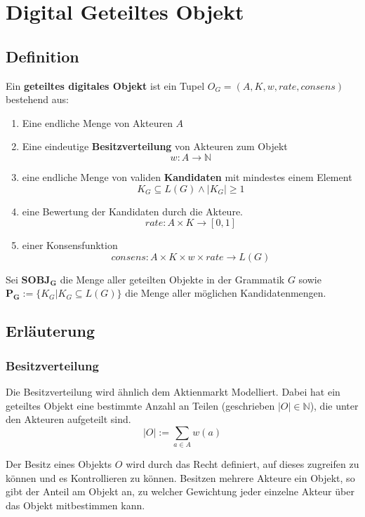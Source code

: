 \documentclass[]{article}
\begin{document}
\newpage
\section{Digital Geteiltes Objekt}
\subsection{Definition}

Ein \textbf{geteiltes digitales Objekt} ist ein Tupel $O_G=(A, K, w, rate, consens)$ bestehend aus:

\begin{enumerate}
\item Eine endliche Menge von Akteuren $A$
\item Eine eindeutige \textbf{Besitzverteilung} von Akteuren zum Objekt
  \[w: A \rightarrow \mathbb{N}\]
\item eine endliche Menge von validen \textbf{Kandidaten} mit mindestes einem Element 
  \[K_G \subseteq L(G) \land |K_G| \geq 1\] 
\item eine Bewertung der Kandidaten durch die Akteure. 
  \[rate: A\times K \rightarrow [0,1]\]
\item einer Konsensfunktion
  \[consens: A\times K\times w \times rate \rightarrow L(G)\] 
\end{enumerate}

Sei $\mathbf{SOBJ_G}$ die Menge aller geteilten Objekte in der Grammatik $G$ sowie 
 $\mathbf{P_G}:= \{ K_G | K_G \subseteq L(G) \}$ die Menge aller möglichen Kandidatenmengen.

\subsection {Erläuterung}


\subsubsection*{Besitzverteilung}


Die Besitzverteilung wird ähnlich dem Aktienmarkt Modelliert. Dabei hat ein geteiltes Objekt eine bestimmte Anzahl an Teilen (geschrieben $|O| \in \mathbb{N}$), die unter den Akteuren aufgeteilt sind. 
\[ |O| := \sum_{a \in A} w(a) \] 

Der Besitz eines Objekts $O$ wird durch das Recht definiert, auf dieses zugreifen zu können und es Kontrollieren zu können\cite{Waldron2004}. Besitzen mehrere Akteure ein Objekt, so gibt der Anteil am Objekt an, zu welcher Gewichtung jeder einzelne Akteur über das Objekt mitbestimmen kann.
\end{document}
